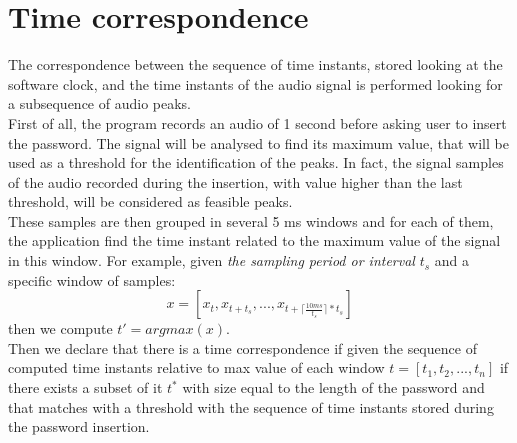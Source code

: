 \section{Time correspondence}
The correspondence between the sequence of time instants, stored looking at the software clock, and the time instants of the audio signal is performed looking for a subsequence of audio peaks. \\
First of all, the program records an audio of 1 second before asking user to insert the password. The signal will be analysed to find its maximum value, that will be used as a threshold for the identification of the peaks. In fact, the signal samples of the audio recorded during the insertion, with value higher than the last threshold, will be considered as feasible peaks.\\
These samples are then grouped in several 5 ms windows and for each of them, the application find the time instant related to the maximum value of the signal in this window. For example, given \textit{the sampling period or interval} $t_s$ and a specific window of samples: $$x = [x_t, x_{t+t_s}, ..., x_{t+\lceil \frac{10ms}{t_s}\rceil * t_s}]$$
then we compute $t'= argmax(x)$.\\
Then we declare that there is a time correspondence if given the sequence of computed time instants relative to max value of each window $t=[t_1, t_2, ..., t_n]$ if there exists a subset of it $t^{*}$ with size equal to the length of the password and that matches with a threshold with the sequence of time instants stored during the password insertion.


